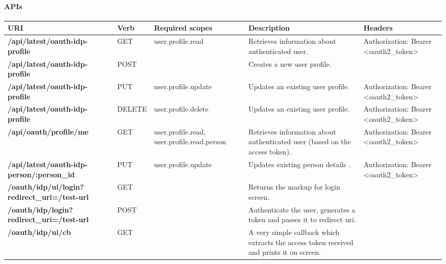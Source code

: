 \documentclass[letterpaper,10pt,english]{sphinxmanual}
\begin{document}
\paragraph{APIs}
\label{features/oauth2/idp:apis}
\begin{tabulary}{\linewidth}{|L|L|L|L|L|}
\hline

\textbf{URI}
 & 
\textbf{Verb}
 & 
\textbf{Required scopes}
 & 
\textbf{Description}
 & 
\textbf{Headers}
\\\hline

\textbf{/api/latest/oauth-idp-profile}
 & 
GET
 & 
user.profile.read
 & 
Retrieves information about authenticated user.
 & 
Authorization: Bearer \textless{}oauth2\_token\textgreater{}
\\\hline

\textbf{/api/latest/oauth-idp-profile}
 & 
POST
 &  & 
Creates a new user profile.
 & \\\hline

\textbf{/api/latest/oauth-idp-profile}
 & 
PUT
 & 
user.profile.update
 & 
Updates an existing user profile.
 & 
Authorization: Bearer \textless{}oauth2\_token\textgreater{}
\\\hline

\textbf{/api/latest/oauth-idp-profile}
 & 
DELETE
 & 
user.profile.delete
 & 
Updates an existing user profile.
 & 
Authorization: Bearer \textless{}oauth2\_token\textgreater{}
\\\hline

\textbf{/api/oauth/profile/me}
 & 
GET
 & 
user.profile.read, user.profile.read.person
 & 
Retrieves information about authenticated user (based on the access token).
 & 
Authorization: Bearer \textless{}oauth2\_token\textgreater{}
\\\hline

\textbf{/api/latest/oauth-idp-person/:person\_id}
 & 
PUT
 & 
user.profile.update
 & 
Updates existing person details .
 & 
Authorization: Bearer \textless{}oauth2\_token\textgreater{}
\\\hline

\textbf{/oauth/idp/ui/login?redirect\_uri=/test-url}
 & 
GET
 &  & 
Returns the markup for login screen.
 & \\\hline

\textbf{/oauth/idp/login?redirect\_uri=/test-url}
 & 
POST
 &  & 
Authenticate the user, generates a token and passes it to redirect uri.
 & \\\hline

\textbf{/oauth/idp/ui/cb}
 & 
GET
 &  & 
A very simple callback which extracts the access token received and prints it on screen.
 & \\\hline
\end{tabulary}
\end{document}
